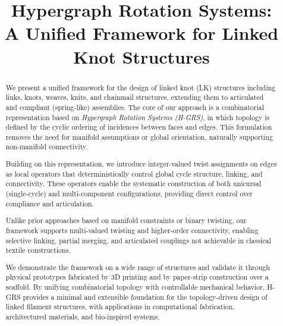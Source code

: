 \documentclass[acmtog,anonymous,review]{acmart}
\begin{document}
\title[Hypergraph Rotation Systems]{Hypergraph Rotation Systems: \\A Unified Framework for Linked Knot Structures}





\renewcommand{\shortauthors}{Anonymous et al.}


\begin{abstract}

We present a unified framework for the design of linked knot (LK) structures including links, knots, weaves, knits, and chainmail structures, extending them to articulated and compliant (spring-like) assemblies. The core of our approach is a combinatorial representation based on \emph{Hypergraph Rotation Systems (H-GRS)}, in which topology is defined by the cyclic ordering of incidences between faces and edges. This formulation removes the need for manifold assumptions or global orientation, naturally supporting non-manifold connectivity.

Building on this representation, we introduce integer-valued twist assignments on edges as local operators that deterministically control global cycle structure, linking, and connectivity. These operators enable the systematic construction of both unicursal (single-cycle) and multi-component configurations, providing direct control over compliance and articulation.

Unlike prior approaches based on manifold constraints or binary twisting, our framework supports multi-valued twisting and higher-order connectivity, enabling selective linking, partial merging, and articulated couplings not achievable in classical textile constructions. 

We demonstrate the framework on a wide range of structures and validate it through physical prototypes fabricated by 3D printing and by paper-strip construction over a scaffold. By unifying combinatorial topology with controllable mechanical behavior, H-GRS provides a minimal and extensible foundation for the topology-driven design of linked filament structures, with applications in computational fabrication, architectured materials, and bio-inspired systems.

\end{abstract}
\end{document}
